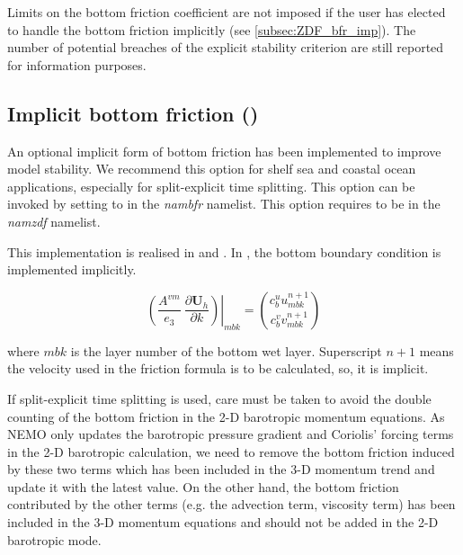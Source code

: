 \documentclass[../tex_main/NEMO_manual]{subfiles}
\begin{document}
Limits on the bottom friction coefficient are not imposed if the user has elected to
handle the bottom friction implicitly (see \autoref{subsec:ZDF_bfr_imp}).
The number of potential breaches of the explicit stability criterion are still reported for information purposes.

\subsection{Implicit bottom friction (\protect{})}
\label{subsec:ZDF_bfr_imp}

An optional implicit form of bottom friction has been implemented to improve model stability.
We recommend this option for shelf sea and coastal ocean applications, especially for split-explicit time splitting.
This option can be invoked by setting  to  in the \textit{nambfr} namelist.
This option requires  to be  in the \textit{namzdf} namelist. 

This implementation is realised in  and . In ,
the bottom boundary condition is implemented implicitly.

\begin{equation} \label{eq:dynzdf_bfr}
\left.{\left( {\frac{A^{vm} }{e_3 }\ \frac{\partial \textbf{U}_h}{\partial k}} \right)} \right|_{mbk}
	 = \binom{c_{b}^{u}u^{n+1}_{mbk}}{c_{b}^{v}v^{n+1}_{mbk}}
\end{equation}

where $mbk$ is the layer number of the bottom wet layer.
Superscript $n+1$ means the velocity used in the friction formula is to be calculated, so, it is implicit.

If split-explicit time splitting is used, care must be taken to avoid the double counting of the bottom friction in
the 2-D barotropic momentum equations.
As NEMO only updates the barotropic pressure gradient and Coriolis' forcing terms in the 2-D barotropic calculation,
we need to remove the bottom friction induced by these two terms which has been included in the 3-D momentum trend 
and update it with the latest value.
On the other hand, the bottom friction contributed by the other terms
(e.g. the advection term, viscosity term) has been included in the 3-D momentum equations and
should not be added in the 2-D barotropic mode.
\end{document}
